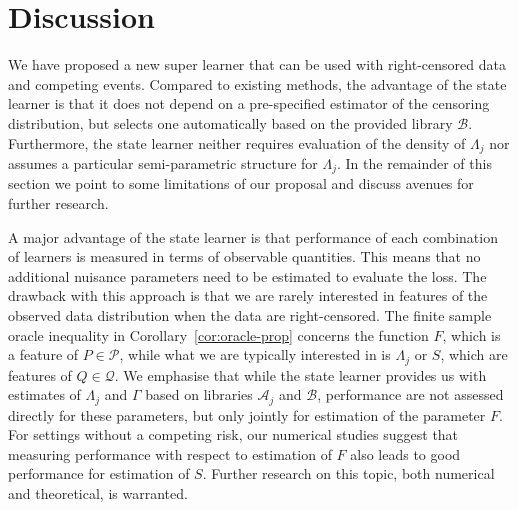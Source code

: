 \documentclass{statsoc}
\newcommand{\1}{\mathds{1}}
\begin{document}
\section{Discussion}
\label{sec:discussion}

We have proposed a new super learner that can be used with right-censored data
and competing events. Compared to existing methods, the advantage of the state
learner is that it does not depend on a pre-specified estimator of the censoring
distribution, but selects one automatically based on the provided library
\( \mathcal{B} \). Furthermore, the state learner neither requires evaluation of
the density of \( \Lambda_j \) nor assumes a particular semi-parametric
structure for $\Lambda_j$. In the remainder of this section we point to some
limitations of our proposal and discuss avenues for further research.

A major advantage of the state learner is that performance of each combination
of learners is measured in terms of observable quantities. This means that no
additional nuisance parameters need to be estimated to evaluate the loss. The
drawback with this approach is that we are rarely interested in features of the
observed data distribution when the data are right-censored. The finite sample
oracle inequality in Corollary~\ref{cor:oracle-prop} concerns the function
\( F \), which is a feature of \( P \in \mathcal{P} \), while what we are
typically interested in is \( \Lambda_j \) or \( S \), which are features of
\( Q \in \mathcal{Q} \). We emphasise that while the state learner provides us
with estimates of \( \Lambda_j \) and $\Gamma$ based on libraries
\( \mathcal{A}_j \) and \( \mathcal{B} \), performance are not assessed directly
for these parameters, but only jointly for estimation of the parameter \( F \).
For settings without a competing risk, our numerical studies suggest that
measuring performance with respect to estimation of \( F \) also leads to good
performance for estimation of \( S \). Further research on this topic, both
numerical and theoretical, is warranted.

\end{document}
